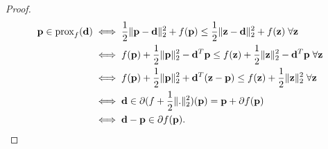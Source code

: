 \begin{proof}
  \[
    \begin{split}
      \mathbf{p} \in \operatorname{prox}_{f}(\mathbf{d}) &\iff \frac{1}{2}\|\mathbf{p}-\mathbf{d}\|_2^2 + f(\mathbf{p}) \le \frac{1}{2}\|\mathbf{z}-\mathbf{d}\|_2^2 + f(\mathbf{z})\; \forall \mathbf{z}\\
      &\iff f(\mathbf{p}) + \frac{1}{2}\|\mathbf{p}\|_2^2 -\mathbf{d}^T\mathbf{p} \le f(\mathbf{z}) + \frac{1}{2}\|\mathbf{z}\|_2^2 -\mathbf{d}^T\mathbf{p}\; \forall \mathbf{z}\\
      &\iff f(\mathbf{p}) + \frac{1}{2}\|\mathbf{p}\|_2^2 + \mathbf{d}^T(\mathbf{z}-\mathbf{p}) \le f(\mathbf{z}) + \frac{1}{2}\|\mathbf{z}\|_2^2\;\forall \mathbf{z}\\
      &\iff \mathbf{d} \in \partial (f + \frac{1}{2}\|.\|_2^2)(\mathbf{p}) = \mathbf{p} + \partial f(\mathbf{p})\\
      &\iff \mathbf{d} - \mathbf{p} \in \partial f(\mathbf{p}).
    \end{split}
  \]
\end{proof}


